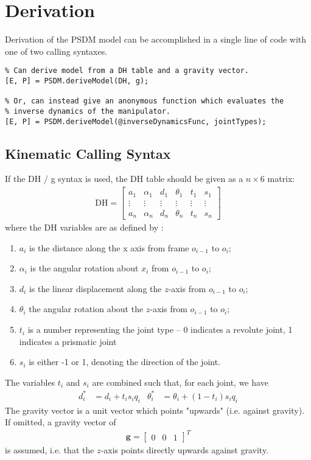 \documentclass[12pt]{article}
\begin{document}
\section{Derivation}

Derivation of the PSDM model can be accomplished in a single line of code with one of two calling syntaxes. 

\begin{lstlisting}
% Can derive model from a DH table and a gravity vector.
[E, P] = PSDM.deriveModel(DH, g);

% Or, can instead give an anonymous function which evaluates the 
% inverse dynamics of the manipulator.
[E, P] = PSDM.deriveModel(@inverseDynamicsFunc, jointTypes);
\end{lstlisting}

\subsection{Kinematic Calling Syntax}
If the DH / g syntax is used, the DH table should be given as a $n\times 6$ matrix:
\begin{align}
	\text{DH} = \begin{bmatrix}
		a_1 & \alpha_1 & d_1 & \theta_1 & t_1 & s_1\\
		\vdots &\vdots &\vdots &\vdots &\vdots &\vdots\\
		a_n & \alpha_n & d_n & \theta_n & t_n & s_n
	\end{bmatrix}
\end{align}
where the DH variables are as defined by \cite{spong2008}:
\begin{enumerate}[itemsep=0pt]
	\item $a_i$ is the distance along the x axis from frame $o_{i-1}$ to $o_i$;
	\item $\alpha_i$ is the angular rotation about $x_i$ from $o_{i-1}$ to $o_i$;
	\item $d_i$ is the linear displacement along the $z$-axis from $o_{i-1}$ to $o_i$;
	\item $\theta_i$ the angular rotation about the $z$-axis from $o_{i-1}$ to $o_i$;
	\item $t_i$ is a number representing the joint type -- 0 indicates a revolute joint, 1 indicates a prismatic joint
	\item $s_i$ is either -1 or 1, denoting the direction of the joint.
\end{enumerate}
The variables $t_i$ and $s_i$ are combined such that, for each joint, we have
\begin{align}
	d_i^* &= d_i + t_i s_i q_i &
	\theta_i^* &= \theta_i + (1-t_i)s_i q_i
\end{align}
The gravity vector is a unit vector which points "upwards" (i.e. against gravity). If omitted, a gravity vector of
\begin{align}
	\mathbf{g} = \begin{bmatrix} 0 & 0 & 1\end{bmatrix}^T
\end{align}
is assumed, i.e. that the $z$-axis points directly upwards against gravity.
\end{document}

